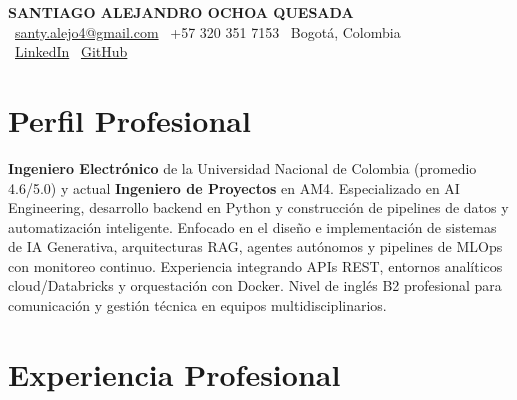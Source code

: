 \documentclass[11pt,a4paper]{article}
\begin{document}
\thispagestyle{empty}
\color{darktext}

\begin{center}
    {\Huge \bfseries\color{accent} SANTIAGO ALEJANDRO OCHOA QUESADA} \\[6pt]
    {\small\color{darktext}
    \faEnvelope\ \href{mailto:santy.alejo4@gmail.com}{santy.alejo4@gmail.com}
    \quad\textcolor{bulletline}{\textbar}\quad
    \faPhone\ +57 320 351 7153
    \quad\textcolor{bulletline}{\textbar}\quad
    \faMapMarker*\ Bogotá, Colombia \\[4pt]
    \faLinkedin\ \href{https://linkedin.com/in/santiago-alejandro-ochoa-quesada-a07a18288/}{LinkedIn}
    \quad\textcolor{bulletline}{\textbar}\quad
    \faGithub\ \href{https://github.com/Sochoaq}{GitHub}
    }
\end{center}
\vspace{4pt}

\section{Perfil Profesional}
\textbf{Ingeniero Electrónico} de la Universidad Nacional de Colombia (promedio 4.6/5.0) y actual \textbf{Ingeniero de Proyectos} en AM4. Especializado en AI Engineering, desarrollo backend en Python y construcción de pipelines de datos y automatización inteligente. Enfocado en el diseño e implementación de sistemas de IA Generativa, arquitecturas RAG, agentes autónomos y pipelines de MLOps con monitoreo continuo. Experiencia integrando APIs REST, entornos analíticos cloud/Databricks y orquestación con Docker. Nivel de inglés B2 profesional para comunicación y gestión técnica en equipos multidisciplinarios.

\section{Experiencia Profesional}
\end{document}
